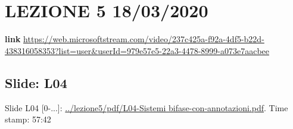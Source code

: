 \section*{LEZIONE 5 18/03/2020}
\textbf{link} \url{https://web.microsoftstream.com/video/237c425a-f92a-4df5-b22d-438316058353?list=user&userId=979e57e5-22a3-4478-8999-a073e7aacbee}
\subsection*{Slide: L04}
Slide L04 [0-...]: \url{../lezione5/pdf/L04-Sistemi bifase-con-annotazioni.pdf}.\newline
\newline
Time stamp: 57:42